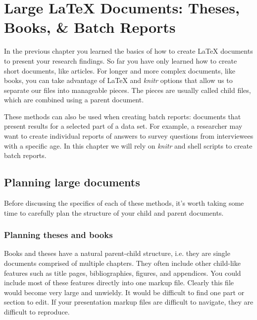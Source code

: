 



\chapter{Large LaTeX Documents: Theses, Books, \& Batch Reports}\label{LargeDocs}


In the previous chapter you learned the basics of how to create LaTeX documents to present your research findings. So far you have only learned how to create short documents, like articles. For longer and more complex documents, like books, you can take advantage of LaTeX and {\emph{knitr}} options that allow us to separate our files into manageable pieces. The pieces are usually called child files, which are combined using a parent document.

These methods can also be used when creating batch reports: documents that present results for a selected part of a data set. For example, a researcher may want to create individual reports of answers to survey questions from interviewees with a specific age. In this chapter we will rely on {\emph{knitr}} and shell scripts to create batch reports. 

\section{Planning large documents}

Before discussing the specifics of each of these methods, it's worth taking some time to carefully plan the structure of your child and parent documents.

\subsection{Planning theses and books}

Books and theses have a natural parent-child structure, i.e. they are single documents comprised of multiple chapters. They often include other child-like features such as title pages, bibliographies, figures, and appendices. You could include most of these features directly into one markup file. Clearly this file would become very large and unwieldy. It would be difficult to find one part or section to edit. If your presentation markup files are difficult to navigate, they are difficult to reproduce.  

